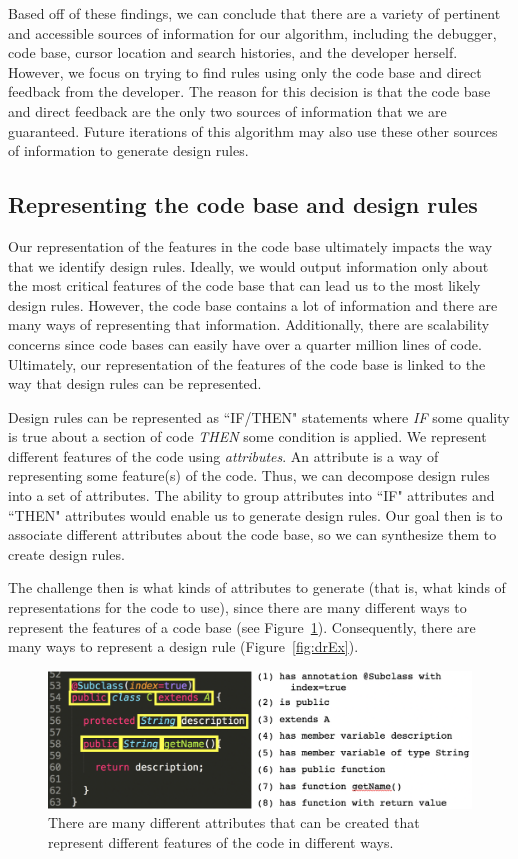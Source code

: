 \documentclass[12pt]{article}
\begin{document}
Based off of  these findings, we can conclude that there are a variety of pertinent and accessible sources of information for our algorithm, including the debugger, code base, cursor location and search histories, and the developer herself. However, we focus on trying to find rules using only the code base and direct feedback from the developer. The reason for this decision is that the code base and direct feedback are the only two sources of information that we are guaranteed. Future iterations of this algorithm may also use these other sources of information to generate design rules.

\subsection{Representing the code base and design rules}
Our representation of the features in the code base ultimately impacts the way that we identify design rules. Ideally, we would output information only about the most critical features of the code base that can lead us to the most likely design rules. However, the code base contains a lot of information and there are many ways of representing that information. Additionally, there are scalability concerns since code bases can easily have over a quarter million lines of code. Ultimately, our representation of the features of the code base is linked to the way that design rules can be represented.

Design rules can be represented as ``IF/THEN" statements where \textit{IF} some quality is true about a section of code \textit{THEN} some condition is applied. We represent different features of the code using \textit{attributes}. An attribute is a way of representing some feature(s) of the code. Thus, we can decompose design rules into a set of attributes. The ability to group attributes into ``IF" attributes and ``THEN" attributes would enable us to generate design rules. Our goal then is to associate different attributes about the code base, so we can synthesize them to create design rules. 

The challenge then is what kinds of attributes to generate (that is, what kinds of representations for the code to use), since there are many different ways to represent the features of a code base (see Figure~\ref{fig:attrEx}). Consequently, there are many ways to represent a design rule (Figure~\ref{fig:drEx}). 

\begin{figure}[h!]
  \includegraphics[width=\linewidth]{attributeEx.png}
  \caption{There are many different attributes that can be created that represent different features of the code in different ways.}
  \label{fig:attrEx}
\end{figure}
\end{document}
